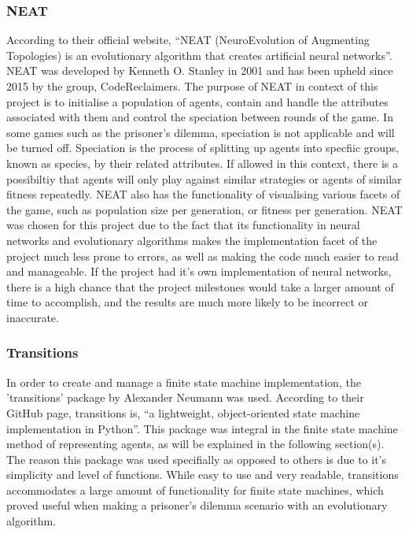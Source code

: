 \documentclass[12pt,a4paper]{article}
\begin{document}
\subsubsection{NEAT}
According to their official website, “NEAT (NeuroEvolution of Augmenting Topologies) is an evolutionary algorithm that creates artificial neural networks”. NEAT was developed by Kenneth O. Stanley in 2001 and has been upheld since 2015 by the group, CodeReclaimers. The purpose of NEAT in context of this project is to initialise a population of agents, contain and handle the attributes associated with them and control the speciation between rounds of the game. In some games such as the prisoner's dilemma, speciation is not applicable and will be turned off. Speciation is the process of splitting up agents into specfiic groups, known as species, by their related attributes. If allowed in this context, there is a possibiltiy that agents will only play against similar strategies or agents of similar fitness repeatedly. NEAT also has the functionality of visualising various facets of the game, such as population size per generation, or fitness per generation. NEAT was chosen for this project due to the fact that its functionality in neural networks and evolutionary algorithms makes the implementation facet of the project much less prone to errors, as well as making the code much easier to read and manageable. If the project had it's own implementation of neural networks, there is a high chance that the project milestones would take a larger amount of time to accomplish, and the results are much more likely to be incorrect or inaccurate.

\subsubsection{Transitions}
In order to create and manage a finite state machine implementation, the 'transitions'\cite{45} package by Alexander Neumann was used. According to their GitHub page, transitions is, “a lightweight, object-oriented state machine implementation in Python”. This package was integral in the finite state machine method of representing agents, as will be explained in the following section(s). The reason this package was used specifially as opposed to others is due to it's simplicity and level of functions. While easy to use and very readable, transitions accommodates a large amount of functionality for finite state machines, which proved useful when making a prisoner's dilemma scenario with an evolutionary algorithm.
\end{document}
